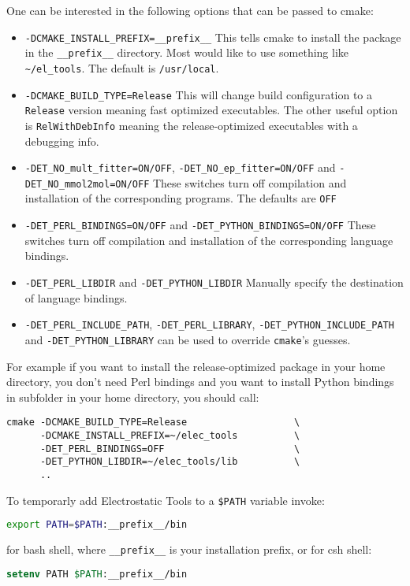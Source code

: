 \documentclass[10pt,a4paper]{article}
\begin{document}
One can be interested in the following options that can be passed to
cmake:
\begin{itemize}
\item
\lstinline{-DCMAKE_INSTALL_PREFIX=__prefix__}
This tells cmake to install the package in the \lstinline{__prefix__} directory. Most 
would like to use something like \lstinline{~/el_tools}. 
The default is \lstinline{/usr/local}.
\item
\lstinline{-DCMAKE_BUILD_TYPE=Release}
This will change build configuration to a \lstinline{Release} version meaning fast 
optimized executables. The other useful option is \lstinline{RelWithDebInfo} 
meaning the release-optimized executables with a debugging info.
\item
\lstinline{-DET_NO_mult_fitter=ON/OFF}, 
\lstinline{-DET_NO_ep_fitter=ON/OFF} and 
\lstinline{-DET_NO_mmol2mol=ON/OFF}
These switches turn off compilation and installation of the corresponding programs.
The defaults are \lstinline{OFF}
\item
\lstinline{-DET_PERL_BINDINGS=ON/OFF} and
\lstinline{-DET_PYTHON_BINDINGS=ON/OFF}
These switches turn off compilation and installation of the corresponding language bindings.
\item
\lstinline{-DET_PERL_LIBDIR} and
\lstinline{-DET_PYTHON_LIBDIR}
Manually specify the destination of language bindings.
\item
\lstinline{-DET_PERL_INCLUDE_PATH},
\lstinline{-DET_PERL_LIBRARY},
\lstinline{-DET_PYTHON_INCLUDE_PATH} and
\lstinline{-DET_PYTHON_LIBRARY}
can be used to override \lstinline{cmake}'s guesses.
\end{itemize}
For example if you want to install the release-optimized package in your home directory, 
you don't need Perl bindings and you want to install Python bindings in subfolder in your home 
directory, you should call:
\begin{lstlisting}
cmake -DCMAKE_BUILD_TYPE=Release                   \
      -DCMAKE_INSTALL_PREFIX=~/elec_tools          \
      -DET_PERL_BINDINGS=OFF                       \
      -DET_PYTHON_LIBDIR=~/elec_tools/lib          \
      ..
\end{lstlisting}

To temporarly add Electrostatic Tools to a \lstinline{$PATH} variable invoke:
\begin{lstlisting}[language=bash]
export PATH=$PATH:__prefix__/bin
\end{lstlisting}
for bash shell, where \lstinline{__prefix__} is your installation prefix, 
or for csh shell:
\begin{lstlisting}[language=csh]
setenv PATH $PATH:__prefix__/bin
\end{lstlisting}
\end{document}
